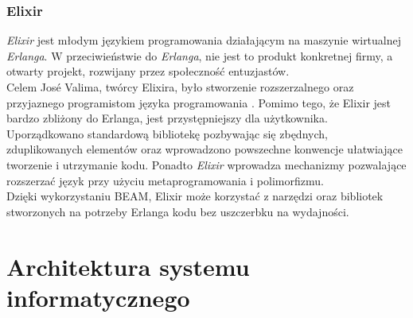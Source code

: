 \documentclass[12pt,twoside]{article}
\begin{document}
\subsubsection{Elixir}\label{elixir}

\emph{Elixir} jest młodym językiem programowania działającym na maszynie
wirtualnej \emph{Erlanga}. W przeciwieństwie do \emph{Erlanga}, nie jest
to produkt konkretnej firmy, a otwarty projekt, rozwijany przez
społeczność entuzjastów.\\
Celem José Valima, twórcy Elixira, było stworzenie rozszerzalnego oraz
przyjaznego programistom języka programowania
\autocite{valim2013design}. Pomimo tego, że Elixir jest bardzo zbliżony
do Erlanga, jest przystępniejszy dla użytkownika. Uporządkowano
standardową bibliotekę pozbywając się zbędnych, zduplikowanych elementów
oraz wprowadzono powszechne konwencje ułatwiające tworzenie i utrzymanie
kodu. Ponadto \emph{Elixir} wprowadza mechanizmy pozwalające rozszerzać
język przy użyciu metaprogramowania i polimorfizmu.\\
Dzięki wykorzystaniu BEAM, Elixir może korzystać z narzędzi oraz
bibliotek stworzonych na potrzeby Erlanga kodu bez uszczerbku na
wydajności\autocite{thomas2014elixir, stlaurent2014elixir}.
\clearpage{}
	\clearpage{}\section{Architektura systemu
informatycznego}\label{architektura-systemu-informatycznego}
\end{document}

